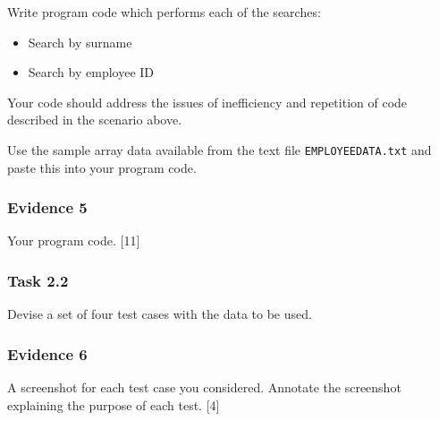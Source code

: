 Write program code which performs each of the searches:
\begin{itemize}
\item Search by surname 
\item Search by employee ID
\end{itemize}
Your code should address the issues of inefficiency and repetition
of code described in the scenario above. 

Use the sample array data available from the text file \texttt{EMPLOYEEDATA.txt}
and paste this into your program code.

\subsubsection*{Evidence 5}

Your program code.\hfill{} {[}11{]}

\subsubsection*{Task 2.2}

Devise a set of four test cases with the data to be used.

\subsubsection*{Evidence 6}

A screenshot for each test case you considered. Annotate the screenshot
explaining the purpose of each test. \hfill{}{[}4{]}